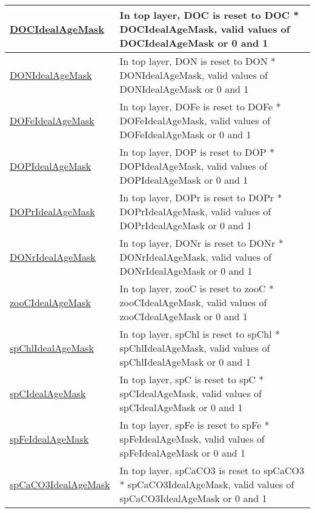 {\begin{center}
\begin{longtable}{| p{2.0in} | p{4.0in} |}
    \hline
    \hyperref[subsec:var_sec_tracersIdealAgeFields_DOCIdealAgeMask]{DOCIdealAgeMask} & In top layer, DOC is reset to DOC * DOCIdealAgeMask, valid values of DOCIdealAgeMask or 0 and 1 \\
    \hline
    \hyperref[subsec:var_sec_tracersIdealAgeFields_DONIdealAgeMask]{DONIdealAgeMask} & In top layer, DON is reset to DON * DONIdealAgeMask, valid values of DONIdealAgeMask or 0 and 1 \\
    \hline
    \hyperref[subsec:var_sec_tracersIdealAgeFields_DOFeIdealAgeMask]{DOFeIdealAgeMask} & In top layer, DOFe is reset to DOFe * DOFeIdealAgeMask, valid values of DOFeIdealAgeMask or 0 and 1 \\
    \hline
    \hyperref[subsec:var_sec_tracersIdealAgeFields_DOPIdealAgeMask]{DOPIdealAgeMask} & In top layer, DOP is reset to DOP * DOPIdealAgeMask, valid values of DOPIdealAgeMask or 0 and 1 \\
    \hline
    \hyperref[subsec:var_sec_tracersIdealAgeFields_DOPrIdealAgeMask]{DOPrIdealAgeMask} & In top layer, DOPr is reset to DOPr * DOPrIdealAgeMask, valid values of DOPrIdealAgeMask or 0 and 1 \\
    \hline
    \hyperref[subsec:var_sec_tracersIdealAgeFields_DONrIdealAgeMask]{DONrIdealAgeMask} & In top layer, DONr is reset to DONr * DONrIdealAgeMask, valid values of DONrIdealAgeMask or 0 and 1 \\
    \hline
    \hyperref[subsec:var_sec_tracersIdealAgeFields_zooCIdealAgeMask]{zooCIdealAgeMask} & In top layer, zooC is reset to zooC * zooCIdealAgeMask, valid values of zooCIdealAgeMask or 0 and 1 \\
    \hline
    \hyperref[subsec:var_sec_tracersIdealAgeFields_spChlIdealAgeMask]{spChlIdealAgeMask} & In top layer, spChl is reset to spChl * spChlIdealAgeMask, valid values of spChlIdealAgeMask or 0 and 1 \\
    \hline
    \hyperref[subsec:var_sec_tracersIdealAgeFields_spCIdealAgeMask]{spCIdealAgeMask} & In top layer, spC is reset to spC * spCIdealAgeMask, valid values of spCIdealAgeMask or 0 and 1 \\
    \hline
    \hyperref[subsec:var_sec_tracersIdealAgeFields_spFeIdealAgeMask]{spFeIdealAgeMask} & In top layer, spFe is reset to spFe * spFeIdealAgeMask, valid values of spFeIdealAgeMask or 0 and 1 \\
    \hline
    \hyperref[subsec:var_sec_tracersIdealAgeFields_spCaCO3IdealAgeMask]{spCaCO3IdealAgeMask} & In top layer, spCaCO3 is reset to spCaCO3 * spCaCO3IdealAgeMask, valid values of spCaCO3IdealAgeMask or 0 and 1 \\

\end{longtable}
\end{center}}
